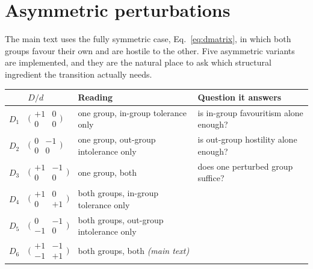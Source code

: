 \section{Asymmetric perturbations}
\label{app:variants}

The main text uses the fully symmetric case, Eq.~\ref{eq:dmatrix}, in which both
groups favour their own and are hostile to the other. Five asymmetric variants are
implemented, and they are the natural place to ask which structural ingredient the
transition actually needs.

\begin{table}[h]
  \centering
  \small
  \begin{tabular}{@{}clll@{}}
    \toprule
    & $D / d$ & \textbf{Reading} & \textbf{Question it answers} \\
    \midrule
    $D_1$ & $\bigl(\begin{smallmatrix} +1 & 0 \\ 0 & 0\end{smallmatrix}\bigr)$
      & one group, in-group tolerance only
      & is in-group favouritism alone enough? \\
    $D_2$ & $\bigl(\begin{smallmatrix} 0 & -1 \\ 0 & 0\end{smallmatrix}\bigr)$
      & one group, out-group intolerance only
      & is out-group hostility alone enough? \\
    $D_3$ & $\bigl(\begin{smallmatrix} +1 & -1 \\ 0 & 0\end{smallmatrix}\bigr)$
      & one group, both
      & does one perturbed group suffice? \\
    $D_4$ & $\bigl(\begin{smallmatrix} +1 & 0 \\ 0 & +1\end{smallmatrix}\bigr)$
      & both groups, in-group tolerance only
      & \\
    $D_5$ & $\bigl(\begin{smallmatrix} 0 & -1 \\ -1 & 0\end{smallmatrix}\bigr)$
      & both groups, out-group intolerance only
      & \\
    $D_6$ & $\bigl(\begin{smallmatrix} +1 & -1 \\ -1 & +1\end{smallmatrix}\bigr)$
      & both groups, both \emph{(main text)}
      & \\
    \bottomrule
  \end{tabular}
\end{table}

